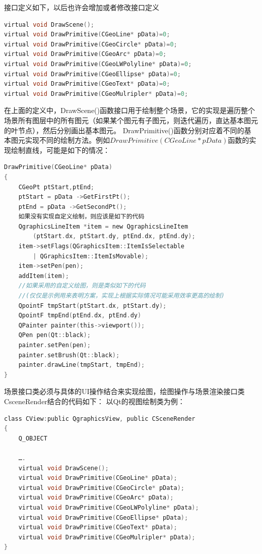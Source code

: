接口定义如下，以后也许会增加或者修改接口定义
\begin{lstlisting}[language=C]
virtual void DrawScene();
virtual void DrawPrimitive(CGeoLine* pData)=0;
virtual void DrawPrimitive(CGeoCircle* pData)=0;
virtual void DrawPrimitive(CGeoArc* pData)=0;
virtual void DrawPrimitive(CGeoLWPolyline* pData)=0;
virtual void DrawPrimitive(CGeoEllipse* pData)=0;
virtual void DrawPrimitive(CGeoText* pData)=0;
virtual void DrawPrimitive(CGeoMulripler* pData)=0;
\end{lstlisting}

在上面的定义中，DrawScene()函数接口用于绘制整个场景，它的实现是遍历整个场景所有图层中的所有图元（如果某个图元有子图元，则迭代遍历，直达基本图元的叶节点），然后分别画出基本图元。
DrawPrimitive()函数分别对应着不同的基本图元实现不同的绘制方法。例如$DrawPrimitive(CGeoLine* pData)$函数的实现绘制直线，可能是如下的情况：
\begin{lstlisting}[language=C]
DrawPrimitive(CGeoLine* pData)
{
	CGeoPt ptStart,ptEnd;
	ptStart = pData ->GetFirstPt();
	ptEnd = pData ->GetSecondPt();
	如果没有实现自定义绘制，则应该是如下的代码
	QgraphicsLineItem *item = new QgraphicsLineItem
	    (ptStart.dx, ptStart.dy, ptEnd.dx, ptEnd.dy);
	item->setFlags(QGraphicsItem::ItemIsSelectable 
	    | QGraphicsItem::ItemIsMovable);
	item->setPen(pen);
	addItem(item);
	//如果采用的自定义绘图，则是类似如下的代码
	//(仅仅是示例用来表明方案，实现上根据实际情况可能采用效率更高的绘制)
	QpointF tmpStart(ptStart.dx, ptStart.dy);
	QpointF tmpEnd(ptEnd.dx, ptEnd.dy)
	QPainter painter(this->viewport());
	QPen pen(Qt::black);    
	painter.setPen(pen);
	painter.setBrush(Qt::black);
	painter.drawLine(tmpStart, tmpEnd);
}
\end{lstlisting}

场景接口类必须与具体的UI操作结合来实现绘图，绘图操作与场景渲染接口类CsceneRender结合的代码如下：
以Qt的视图绘制类为例：

\begin{lstlisting}[language=C]
class CView:public QgraphicsView, public CSceneRender
{
	Q_OBJECT
	
	….
	virtual void DrawScene();
	virtual void DrawPrimitive(CGeoLine* pData);
	virtual void DrawPrimitive(CGeoCircle* pData);
	virtual void DrawPrimitive(CGeoArc* pData);
	virtual void DrawPrimitive(CGeoLWPolyline* pData);
	virtual void DrawPrimitive(CGeoEllipse* pData);
	virtual void DrawPrimitive(CGeoText* pData);
	virtual void DrawPrimitive(CGeoMulripler* pData);
}
\end{lstlisting}

